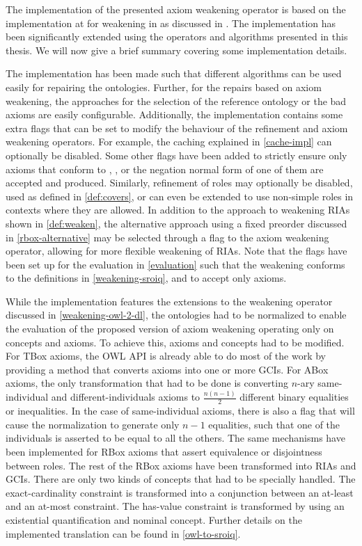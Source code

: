 
The implementation of the presented axiom weakening operator is based on the implementation at \cite{ontologyutils} for weakening in \ALC as discussed in \cite{troquard2018repairing}. The implementation has been significantly extended using the operators and algorithms presented in this thesis. We will now give a brief summary covering some implementation details.

The implementation has been made such that different algorithms can be used easily for repairing the ontologies. Further, for the repairs based on axiom weakening, the approaches for the selection of the reference ontology or the bad axioms are easily configurable. Additionally, the implementation contains some extra flags that can be set to modify the behaviour of the refinement and axiom weakening operators. For example, the caching explained in \cref{cache-impl} can optionally be disabled. Some other flags have been added to strictly ensure only axioms that conform to \ALC, \SROIQ, or the negation normal form of one of them are accepted and produced. Similarly, refinement of roles may optionally be disabled, used as defined in \cref{def:covers}, or can even be extended to use non-simple roles in contexts where they are allowed. In addition to the approach to weakening RIAs shown in \cref{def:weaken}, the alternative approach using a fixed preorder discussed in \cref{rbox-alternative} may be selected through a flag to the axiom weakening operator, allowing for more flexible weakening of RIAs. Note that the flags have been set up for the evaluation in \cref{evaluation} such that the weakening conforms to the definitions in \cref{weakening-sroiq}, and to accept only \SROIQ axioms.

While the implementation features the extensions to the weakening operator discussed in \cref{weakening-owl-2-dl}, the ontologies had to be normalized to enable the evaluation of the proposed version of axiom weakening operating only on \SROIQ concepts and axioms. To achieve this, axioms and concepts had to be modified. For TBox axioms, the OWL API is already able to do most of the work by providing a method that converts axioms into one or more GCIs. For ABox axioms, the only transformation that had to be done is converting $n$-ary same-individual and different-individuals axioms to $\frac{n (n - 1)}{2}$ different binary equalities or inequalities. In the case of same-individual axioms, there is also a flag that will cause the normalization to generate only $n - 1$ equalities, such that one of the individuals is asserted to be equal to all the others. The same mechanisms have been implemented for RBox axioms that assert equivalence or disjointness between roles. The rest of the RBox axioms have been transformed into RIAs and GCIs. There are only two kinds of concepts that had to be specially handled. The exact-cardinality constraint is transformed into a conjunction between an at-least and an at-most constraint. The has-value constraint is transformed by using an existential quantification and nominal concept. Further details on the implemented translation can be found in \cref{owl-to-sroiq}.

